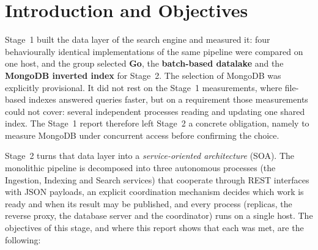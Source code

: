 \documentclass[10pt,a4paper]{article}
\begin{document}
\tableofcontents
\clearpage
{}

\setcounter{section}{1}

\section{Introduction and Objectives}
\label{sec:introduction}

Stage~1 built the data layer of the search engine and measured it: four
behaviourally identical implementations of the same pipeline were compared on
one host, and the group selected \textbf{Go}, the \textbf{batch-based
datalake} and the \textbf{MongoDB inverted index} for Stage~2. The selection
of MongoDB was explicitly provisional. It did not rest on the Stage~1
measurements, where file-based indexes answered queries faster, but on a
requirement those measurements could not cover: several independent processes
reading and updating one shared index. The Stage~1 report therefore left
Stage~2 a concrete obligation, namely to measure MongoDB under concurrent
access before confirming the choice.

Stage~2 turns that data layer into a \emph{service-oriented architecture}
(SOA). The monolithic pipeline is decomposed into three autonomous processes
(the Ingestion, Indexing and Search services) that cooperate through REST
interfaces with JSON payloads, an explicit coordination mechanism decides which
work is ready and when its result may be published, and every process
(replicas, the reverse proxy, the database server and the coordinator) runs on
a single host. The objectives of this stage, and where this report shows that
each was met, are the following:
\end{document}
